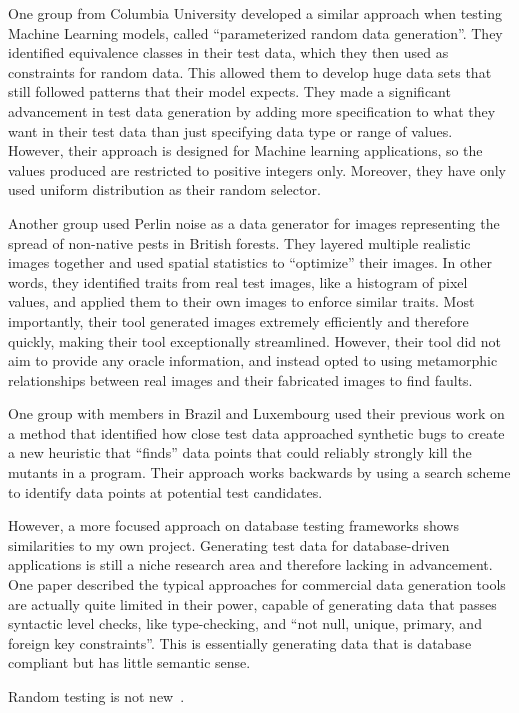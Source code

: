 One group from Columbia University developed a similar approach when testing Machine Learning models, called ``parameterized random data generation''. They identified equivalence classes in their test data, which they then used as constraints for random data. This allowed them to develop huge data sets that still followed patterns that their model expects. They made a significant advancement in test data generation by adding more specification to what they want in their test data than just specifying data type or range of values. However, their approach is designed for Machine learning applications, so the values produced are restricted to positive integers only. Moreover, they have only used uniform distribution as their random selector.

Another group used Perlin noise as a data generator for images representing the spread of non-native pests in British forests. They layered multiple realistic images together and used spatial statistics to ``optimize'' their images. In other words, they identified traits from real test images, like a histogram of pixel values, and applied them to their own images to enforce similar traits. Most importantly, their tool generated images extremely efficiently and therefore quickly, making their tool exceptionally streamlined. However, their tool did not aim to provide any oracle information, and instead opted to using metamorphic relationships between real images and their fabricated images to find faults.

One group with members in Brazil and Luxembourg used their previous work on a method that identified how close test data approached synthetic bugs to create a new heuristic that ``finds'' data points that could reliably strongly kill the mutants in a program. Their approach works backwards by using a search scheme to identify data points at potential test candidates.

However, a more focused approach on database testing frameworks shows similarities to my own project. Generating test data for database-driven applications is still a niche research area and therefore lacking in advancement. One paper described the typical approaches for commercial data generation tools are actually quite limited in their power, capable of generating data that passes syntactic level checks, like type-checking, and ``not null, unique, primary, and foreign key constraints''. This is essentially generating data that is database compliant but has little semantic sense.

Random testing is not new~\cite{Hughes:2016:FMB:2896921.2896928}.